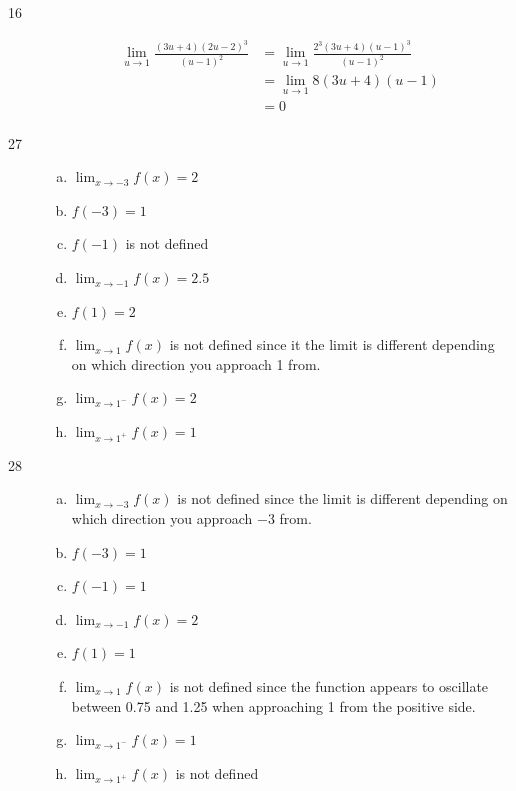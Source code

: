 \documentclass{exam}
\begin{document}
\begin{description}
\item[16]
\begin{align*}
   \lim_{u \to 1} \frac{(3u + 4)(2u-2)^3}{(u-1)^2} &=  \lim_{u \to 1} \frac{2^3(3u + 4)(u-1)^3}{(u-1)^2} \\
   &= \lim_{u \to 1} 8 (3u + 4)(u-1) \\  
   &= 0 \\
\end{align*}

\item[27]
\begin{enumerate}[(a)]

\item $\lim_{x \to -3} f(x) = 2$
\item $f(-3) = 1$
\item $f(-1)$ is not defined
\item $\lim_{x \to -1} f(x) = 2.5$

\item $f(1) = 2$
\item $\lim_{x \to 1} f(x)$ is not defined since it the limit is different depending on which direction you approach 1 from.

\item $\lim_{x \to 1^-} f(x) = 2$ 
\item $\lim_{x \to 1^+} f(x) = 1$ 

\end{enumerate}

\item[28]
\begin{enumerate}[(a)]

\item $\lim_{x \to -3} f(x)$ is not defined since the limit is different depending on which direction you approach $-3$ from.
\item $f(-3) = 1$

\item $f(-1) = 1$
\item $\lim_{x \to -1} f(x) = 2$

\item $f(1) = 1$
\item $\lim_{x \to 1} f(x)$ is not defined since the function appears to oscillate between 0.75 and 1.25 when approaching 1
  from the positive side.

\item $\lim_{x \to 1^-} f(x) = 1$ 
\item $\lim_{x \to 1^+} f(x)$ is not defined

\end{enumerate}


\end{description}
\end{document}
